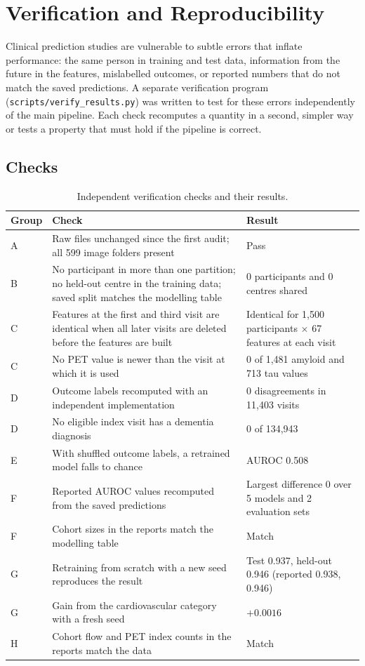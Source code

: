 \chapter{Verification and Reproducibility}
\label{ch:verification}

Clinical prediction studies are vulnerable to subtle errors that inflate performance: the same person in training and test data, information from the future in the features, mislabelled outcomes, or reported numbers that do not match the saved predictions. A separate verification program (\texttt{scripts/verify\_results.py}) was written to test for these errors independently of the main pipeline. Each check recomputes a quantity in a second, simpler way or tests a property that must hold if the pipeline is correct.

\section{Checks}

\begin{table}[H]
\centering\small
\caption{Independent verification checks and their results.}
\label{tab:checks}
\begin{tabularx}{\textwidth}{@{}lYY@{}}
\toprule
Group & Check & Result \\
\midrule
A & Raw files unchanged since the first audit; all 599 image folders present & Pass \\
B & No participant in more than one partition; no held-out centre in the training data; saved split matches the modelling table & 0 participants and 0 centres shared \\
C & Features at the first and third visit are identical when all later visits are deleted before the features are built & Identical for 1,500 participants $\times$ 67 features at each visit \\
C & No PET value is newer than the visit at which it is used & 0 of 1,481 amyloid and 713 tau values \\
D & Outcome labels recomputed with an independent implementation & 0 disagreements in 11,403 visits \\
D & No eligible index visit has a dementia diagnosis & 0 of 134,943 \\
E & With shuffled outcome labels, a retrained model falls to chance & AUROC 0.508 \\
F & Reported AUROC values recomputed from the saved predictions & Largest difference 0 over 5 models and 2 evaluation sets \\
F & Cohort sizes in the reports match the modelling table & Match \\
G & Retraining from scratch with a new seed reproduces the result & Test 0.937, held-out 0.946 (reported 0.938, 0.946) \\
G & Gain from the cardiovascular category with a fresh seed & $+0.0016$ \\
H & Cohort flow and PET index counts in the reports match the data & Match \\
\bottomrule
\end{tabularx}
\end{table}


